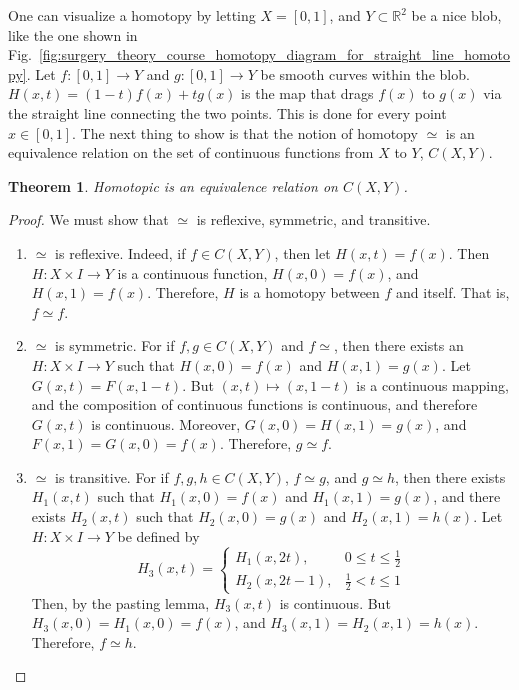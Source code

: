 \documentclass[oneside]{book}
\theoremstyle{mystyle}
\newtheorem{theorem}{Theorem}[section]
\begin{document}
One can visualize a homotopy by letting $X = [0,1]$, and $Y\subset \mathbb{R}^{2}$ be a nice blob, like the one shown in Fig.~\ref{fig:surgery_theory_course_homotopy_diagram_for_straight_line_homotopy}. Let $f:[0,1]\rightarrow Y$ and $g:[0,1]\rightarrow Y$ be smooth curves within the blob. $H(x,t) = (1-t)f(x)+tg(x)$ is the map that drags $f(x)$ to $g(x)$ via the straight line connecting the two points. This is done for every point $x\in [0,1]$. The next thing to show is that the notion of homotopy $\simeq$ is an equivalence relation on the set of continuous functions from $X$ to $Y$, $C(X,Y)$.
\begin{theorem}
Homotopic is an equivalence relation on $C(X,Y)$.
\end{theorem}
\begin{proof}
We must show that $\simeq$ is reflexive, symmetric, and transitive.
\begin{enumerate}
    \item $\simeq$ is reflexive. Indeed, if $f\in C(X,Y)$, then let $H(x,t) = f(x)$. Then $H:X\times I \rightarrow Y$ is a continuous function, $H(x,0) = f(x)$, and $H(x,1) = f(x)$. Therefore, $H$ is a homotopy between $f$ and itself. That is, $f\simeq f$.
    \item $\simeq$ is symmetric. For if $f,g\in C(X,Y)$ and $f\simeq$, then there exists an $H:X\times I \rightarrow Y$ such that $H(x,0) = f(x)$ and $H(x,1) = g(x)$. Let $G(x,t) = F(x,1-t)$. But $(x,t)\mapsto (x,1-t)$ is a continuous mapping, and the composition of continuous functions is continuous, and therefore $G(x,t)$ is continuous. Moreover, $G(x,0) = H(x,1) = g(x)$, and $F(x,1) = G(x,0) = f(x)$. Therefore, $g\simeq f$.
    \item $\simeq$ is transitive. For if $f,g,h\in C(X,Y)$, $f\simeq g$, and $g\simeq h$, then there exists $H_{1}(x,t)$ such that $H_{1}(x,0) = f(x)$ and $H_{1}(x,1) = g(x)$, and there exists $H_{2}(x,t)$ such that $H_{2}(x,0) = g(x)$ and $H_{2}(x,1) = h(x)$. Let $H:X\times I\rightarrow Y$ be defined by
    \begin{equation*}
        H_{3}(x,t) = \begin{cases} H_{1}(x,2t), & 0\leq t\leq \frac{1}{2}\\ H_{2}(x,2t-1), & \frac{1}{2}<t\leq 1 \end{cases}
    \end{equation*}
    Then, by the pasting lemma, $H_{3}(x,t)$ is continuous. But $H_{3}(x,0) = H_{1}(x,0) = f(x)$, and $H_{3}(x,1) = H_{2}(x,1) = h(x)$. Therefore, $f\simeq h$.
\end{enumerate}
\end{proof}
\end{document}
